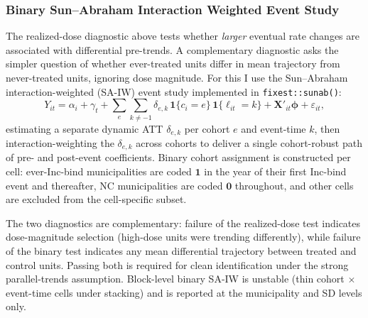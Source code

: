 \documentclass[12pt]{article}
\begin{document}
\subsubsection{Binary Sun--Abraham Interaction Weighted Event Study}
\label{subsec:binary-sa-es}

The realized-dose diagnostic above tests whether \textit{larger}
eventual rate changes are associated with differential pre-trends. A
complementary diagnostic asks the simpler question of whether
ever-treated units differ in mean trajectory from never-treated units,
ignoring dose magnitude. For this I use the
Sun--Abraham interaction-weighted (SA-IW) event study \citep{sunab2021}
implemented in \texttt{fixest::sunab()}:
\begin{equation}
Y_{it} = \alpha_i + \gamma_t
+ \sum_{e}\sum_{k \neq -1} \delta_{e,k}\,
\mathbf{1}\{c_i = e\}\, \mathbf{1}\{\ell_{it} = k\}
+ \mathbf{X}'_{it}\boldsymbol{\phi} + \varepsilon_{it},
\label{eq:sunab-binary}
\end{equation}
estimating a separate dynamic ATT $\delta_{e,k}$ per cohort $e$ and
event-time $k$, then interaction-weighting the $\delta_{e,k}$ across
cohorts to deliver a single cohort-robust path of pre- and post-event
coefficients. Binary cohort assignment is constructed per cell: ever-Inc-bind municipalities are coded $\mathbf{1}$ in the
year of their first Inc-bind event and thereafter, NC municipalities are
coded $\mathbf{0}$ throughout, and other cells are excluded from the
cell-specific subset.

The two diagnostics are complementary: failure of the realized-dose
test indicates dose-magnitude selection (high-dose units were
trending differently), while failure of the binary test indicates
any mean differential trajectory between treated and control
units. Passing both is required for clean identification under the
strong parallel-trends assumption. Block-level binary SA-IW is
unstable (thin cohort $\times$ event-time cells under stacking) and
is reported at the municipality and SD levels only.
\end{document}

